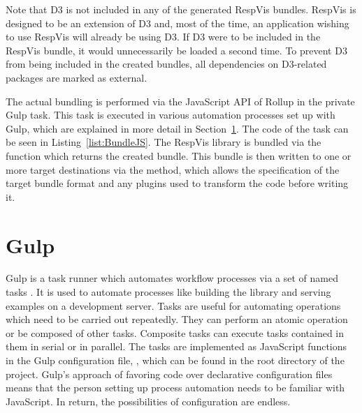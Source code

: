 Note that D3 is not included in any of the generated RespVis
bundles. RespVis is designed to be an extension of D3 and, most of the
time, an application wishing to use RespVis will already be using
D3. If D3 were to be included in the RespVis bundle, it would
unnecessarily be loaded a second time. To prevent D3 from being
included in the created bundles, all dependencies on D3-related
packages are marked as external.

The actual bundling is performed via the JavaScript API of Rollup in
the private  Gulp task. This task is executed in
various automation processes set up with Gulp, which are explained in
more detail in Section~\ref{sec:Gulp}. The code of the 
task can be seen in Listing~\ref{list:BundleJS}. The RespVis library
is bundled via the  function which returns the
created bundle. This bundle is then written to one or more target
destinations via the  method, which allows the
specification of the target bundle format and any plugins used to
transform the code before writing it.


\begin{samepage}
%
The private Gulp task which bundles the code of the RespVis libary.
The bundle is created once and then written to multiple targets.
}
]{listings/bundle-js.js}
\end{samepage}
  





\section{Gulp}
\label{sec:Gulp}

Gulp is a task runner which automates workflow processes via a set of
named tasks \parencite{Gulp}. It is used to automate processes like
building the library and serving examples on a development server.
Tasks are useful for automating operations which need to be carried
out repeatedly. They can perform an atomic operation or be composed of
other tasks. Composite tasks can execute tasks contained in them in
serial or in parallel. The tasks are implemented as JavaScript
functions in the Gulp configuration file, , which
can be found in the root directory of the project. Gulp's approach of
favoring code over declarative configuration files means that the
person setting up process automation needs to be familiar with
JavaScript. In return, the possibilities of configuration are endless.


